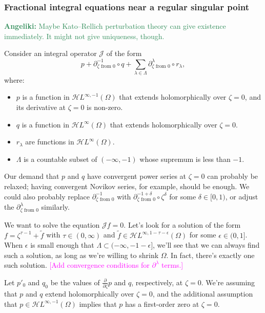 \documentclass{article}
\theoremstyle{plain}
\newcommand{\holoL}[1]{\mathcal{H}L^{#1}} %
\begin{document}
\subsubsection{Fractional integral equations near a regular singular point}
\textcolor{SeaGreen}{\textbf{Angeliki:} Maybe Kato--Rellich perturbation theory can give existence immediately. It might not give uniqueness, though.}

Consider an integral operator $\mathcal{J}$ of the form
\[ p + \partial^{-1}_{\zeta \text{ from } 0} \circ q + \sum_{\lambda \in \Lambda} \partial^\lambda_{\zeta \text{ from } 0} \circ r_\lambda, \]
where:
\begin{itemize}
\item $p$ is a function in $\holoL{\infty, -1}(\Omega)$ that extends holomorphically over $\zeta = 0$, and its derivative at $\zeta = 0$ is non-zero.
\item $q$ is a function in $\holoL{\infty}(\Omega)$ that extends holomorphically over $\zeta = 0$.
\item $r_\lambda$ are functions in $\holoL{\infty}(\Omega)$.
\item $\Lambda$ is a countable subset of $(-\infty, -1)$ whose supremum is less than $-1$.
\end{itemize}
Our demand that $p$ and $q$ have convergent power series at $\zeta = 0$ can probably be relaxed; having convergent Novikov series, for example, should be enough. We could also probably replace $\partial^{-1}_{\zeta \text{ from } 0}$ with $\partial^{-1+\delta}_{\zeta \text{ from } 0} \circ \zeta^\delta$ for some $\delta \in [0, 1)$, or adjust the $\partial^\lambda_{\zeta \text{ from } 0}$ similarly.

We want to solve the equation $\mathcal{J}f = 0$. Let's look for a solution of the form $f = \zeta^{\tau-1} + \tilde{f}$ with $\tau \in (0, \infty)$ and $\tilde{f} \in \holoL{\infty, 1-\tau-\epsilon}(\Omega)$ for some $\epsilon \in (0, 1]$. When $\epsilon$ is small enough that $\Lambda \subset (-\infty, -1 - \epsilon]$, we'll see that we can always find such a solution, as long as we're willing to shrink $\Omega$. In fact, there's exactly one such solution. \textcolor{magenta}{[Add convergence conditions for $\partial^\lambda$ terms.]}

Let $p'_0$ and $q_0$ be the values of $\tfrac{\partial}{\partial \zeta} p$ and $q$, respectively, at $\zeta = 0$. We're assuming that $p$ and $q$ extend holomorphically over $\zeta = 0$, and the additional assumption that $p \in \holoL{\infty, -1}(\Omega)$ implies that $p$ has a first-order zero at $\zeta = 0$.
\end{document}
